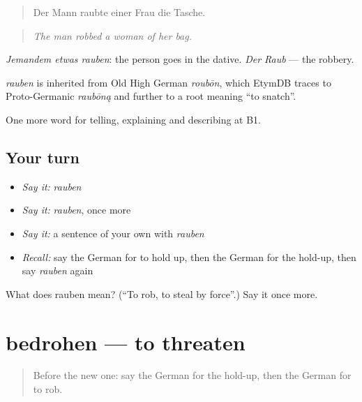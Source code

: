 \begin{quote}
Der Mann raubte einer Frau die Tasche.
\end{quote}

\begin{quote}
\emph{The man robbed a woman of her bag.}
\end{quote}

\emph{Jemandem etwas rauben}: the person goes in the dative. \emph{Der Raub} — the robbery.

\begin{cousinweb}
\emph{rauben} is inherited from Old High German \emph{roubōn}, which EtymDB traces to Proto-Germanic \emph{raubōną} and further to a root meaning \textquotedblleft{}to snatch\textquotedblright{}.
\end{cousinweb}

\begin{grammarlens}[title={What you've built}]
One more word for telling, explaining and describing at B1.
\end{grammarlens}

\subsection*{Your turn}
\begin{itemize}
\raggedright
  \item \emph{Say it:} \emph{rauben}
  \item \emph{Say it:} \emph{rauben}, once more
  \item \emph{Say it:} a sentence of your own with \emph{rauben}
  \item \emph{Recall:} say the German for to hold up, then the German for the hold-up, then say \emph{rauben} again
\end{itemize}

\begin{tcolorbox}[breakable,colback=teal!4,colframe=teal!35!black,title={Before you move on}]
What does rauben mean? (\textquotedblleft{}To rob, to steal by force\textquotedblright{}.) Say it once more.
\end{tcolorbox}
\section[bedrohen]{bedrohen — to threaten}

\label{lesson:GE-C282-bedrohen}



\begin{quote}
Before the new one: say the German for the hold-up, then the German for to rob.
\end{quote}

